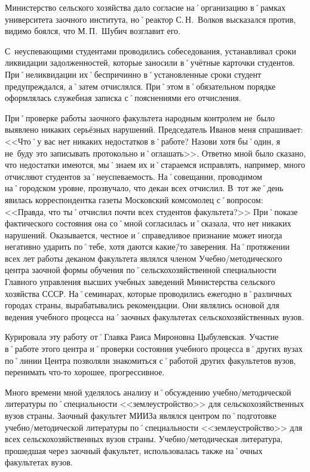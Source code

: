 Министерство сельского хозяйства дало согласие на˚организацию в˚рамках университета заочного института, но˚реактор С.\,Н.~Волков высказался против, видимо боялся, что М.\,П.~Шубич возглавит его.

С~неуспевающими студентами проводились собеседования, устанавливал сроки ликвидации задолженностей, которые заносили в˚учётные карточки студентов. При˚неликвидации их˚беспричинно в˚установленные сроки студент предупреждался, а˚затем отчислялся. При˚этом в˚обязательном порядке оформлялась служебная записка с˚пояснениями его отчисления.

При˚проверке работы заочного факультета народным контролем не~было выявлено никаких серьёзных нарушений. Председатель Иванов меня спрашивает: <<Что˚у вас нет никаких недостатков в˚работе? Назови хотя бы˚один, я не~буду это записывать протокольно и˚оглашать>>. Ответно мной было сказано, что недостатки имеются, мы˚знаем их и˚стараемся исправлять, например, много отчисляют студентов за˚неуспеваемость. На˚совещании, проводимом на˚городском уровне, прозвучало, что декан всех отчислил. В~тот же˚день явилась корреспондентка газеты Московский комсомолец с˚вопросом: <<Правда, что ты˚отчислил почти всех студентов факультета?>> При˚показе фактического состояния она со˚мной согласилась и˚сказала, что нет никаких нарушений. Оказывается, честное и˚справедливое признание может иногда негативно ударить по˚тебе, хотя даются какие\=/то заверения. На˚протяжении всех лет работы деканом факультета являлся членом Учебно\-/методического центра заочной формы обучения по˚сельскохозяйственной специальности Главного управления высших учебных заведений Министерства сельского хозяйства СССР. На˚семинарах, которые проводились ежегодно в˚различных городах страны, вырабатывались рекомендации. Они являлись основой для ведения учебного процесса на˚заочных факультетах сельскохозяйственных вузов.

Курировала эту работу от˚Главка Раиса Мироновна Цыбулевская. Участие в˚работе этого центра и˚проверки состояния учебного процесса в˚других вузах по˚линии Центра позволяли знакомиться с˚работой других факультетов вузов, перенимать что-то хорошее, прогрессивное.

Много времени мной уделялось анализу и˚обсуждению учебно\-/методической литературы по˚специальности <<землеустройство>> для сельскохозяйственных вузов страны. Заочный факультет МИИЗа являлся центром по˚подготовке учебно\-/методической литературы по˚специальности <<землеустройство>> для всех сельскохозяйственных вузов страны. Учебно\-/методическая литература, прошедшая через заочный факультет, использовалась также на˚очных факультетах вузов.

